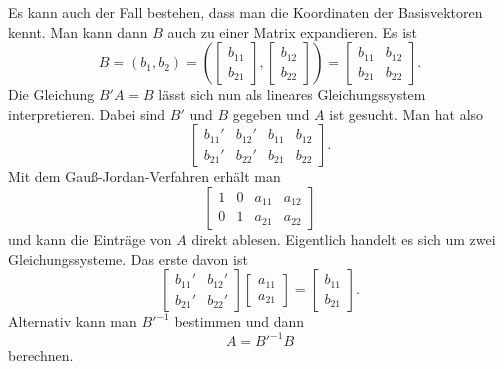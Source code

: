 \documentclass[a4paper,10pt,fleqn,twocolumn,twoside]{article}
\numberwithin{equation}{section}
\begin{document}
Es kann auch der Fall bestehen, dass man die Koordinaten der
Basisvektoren kennt. Man kann dann $B$ auch zu einer Matrix
expandieren. Es ist
\begin{equation}
B = (b_1,b_2)
= (\begin{bmatrix}b_{11}\\ b_{21}\end{bmatrix},
\begin{bmatrix}b_{12}\\ b_{22}\end{bmatrix})
= \begin{bmatrix}
b_{11} & b_{12}\\
b_{21} & b_{22}
\end{bmatrix}.
\end{equation}
Die Gleichung $B'A=B$ lässt sich nun als lineares Gleichungssystem
interpretieren. Dabei sind $B'$ und $B$ gegeben und $A$ ist
gesucht. Man hat also
\begin{equation}
\left[\begin{array}{cc|cc}
b_{11}' & b_{12}' & b_{11} & b_{12}\\
b_{21}' & b_{22}' & b_{21} & b_{22}
\end{array}\right].
\end{equation}
Mit dem Gauß-Jordan-Verfahren erhält man
\begin{equation}
\left[\begin{array}{cc|cc}
1 & 0 & a_{11} & a_{12}\\
0 & 1 & a_{21} & a_{22}
\end{array}\right]
\end{equation}
und kann die Einträge von $A$ direkt ablesen.
Eigentlich handelt es sich um zwei Gleichungssysteme.
Das erste davon ist
\begin{equation}
\begin{bmatrix}
b_{11}' & b_{12}'\\
b_{21}' & b_{22}'
\end{bmatrix}
\begin{bmatrix}
a_{11}\\ a_{21}
\end{bmatrix}
= \begin{bmatrix}
b_{11}\\ b_{21}
\end{bmatrix}.
\end{equation}
Alternativ kann man $B'^{-1}$ bestimmen und dann
\begin{equation}
A = B'^{-1}B
\end{equation}
berechnen.
\end{document}
